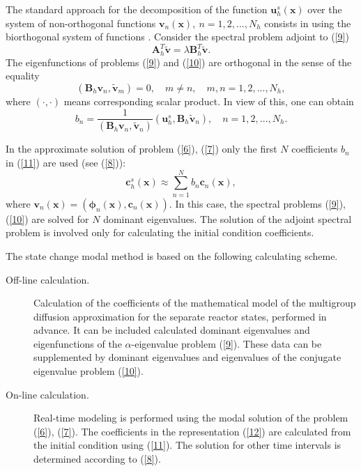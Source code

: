 \documentclass[a4paper]{jpconf}
\begin{document}
The standard approach for the decomposition of the function  $\bm u_h^s (\bm x) $ 
over the system of non-orthogonal functions $\bm v_n(\bm x), \ n = 1,2, ..., N_h$ 
consists in using the biorthogonal system of functions 
\cite{brezinski1991biorthogonality}.
Consider the spectral problem adjoint to (\ref{9})  
\begin{equation}\label{10}
 \bm A_h^T \widetilde{\bm v}  = \lambda  \bm B_h^T \widetilde{\bm v} .
\end{equation} 
The eigenfunctions of problems  (\ref{9}) and (\ref{10}) are orthogonal  in the sense of the equality
\[
  (\bm B_h \bm v_n, \widetilde{\bm v}_m)= 0, 
  \quad m \neq n,
  \quad m, n = 1,2, ..., N_h , 
\] 
where $(\cdot, \cdot)$ means corresponding scalar product. 
In view of this, one can obtain
\begin{equation}\label{11}
 b_n = \frac{1}{(\bm B_h \bm v_n, \widetilde{\bm v}_n)} (\bm u_h^s, \bm B_h \widetilde{\bm v}_n),
 \quad n = 1,2, ..., N_h .  
\end{equation} 

In the approximate solution of problem   (\ref{6}), (\ref{7}) only the first $N$ coefficients  $b_n$ in (\ref{11}) are used (see (\ref{8})):
\begin{equation}\label{12}
 \bm c_h^s (\bm x) \approx  \sum_{n=1}^{N} b_n \bm c_n(\bm x) ,
\end{equation} 
where $\bm v_n (\bm x) = (\bm \phi_n (\bm x), \bm c_n (\bm x))$.
In this case, the spectral problems  (\ref{9}), (\ref{10}) are solved for $N$ dominant 
eigenvalues.
The solution of the adjoint spectral problem is involved only for calculating the initial condition coefficients. 

The state change modal method is based on the following calculating scheme.
\begin{description}
 \item[Off-line calculation.] Calculation of the coefficients of the mathematical model of the multigroup diffusion approximation for the separate reactor states, performed in advance. It can be included calculated dominant eigenvalues and eigenfunctions of the  $\alpha$-eigenvalue problem (\ref{9}). 
These data can be supplemented by dominant eigenvalues and eigenvalues of the conjugate eigenvalue problem (\ref{10}).
 \item[On-line calculation.] Real-time modeling is performed using the modal solution of the problem  (\ref{6}), (\ref{7}).
The coefficients in the representation  (\ref{12}) are calculated from the initial condition using (\ref{11}). The solution for other time intervals is determined according to (\ref{8}).
\end{description}  
\end{document}
